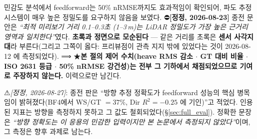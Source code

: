 \documentclass[11pt]{report}
\numberwithin{equation}{chapter}
\numberwithin{figure}{chapter}
\numberwithin{table}{chapter}
\begin{document}
민감도 분석에서 feedforward는 50\% nRMSE까지도 효과적임이 확인되어,
파도 추정 시스템이 매우 높은 정밀도를 요구하지 않음을 보였다.
⛔\textbf{[정정, 2026-08-23]} 종전 문안은 \emph{``최적 미리보기 거리 0.1--0.3초
(1--3\,m)는 LiDAR 정밀도가 가장 높은 근거리 영역과 일치한다''}였다. \textbf{초록과
정면으로 모순된다} --- 같은 거리를 초록은 \textbf{센서 사각지대}라 부른다(그리고 그쪽이
옳다: 프리뷰점이 관측 지지 밖에 있었다는 것이 2026-08-12 에 측정되었다).
⟹ ★\textbf{본 절의 제어 수치(heave RMS 감소 $\cdot$ GT 대비 비율 $\cdot$ ISO 2631 등급
$\cdot$ 50\% nRMSE 강건성)는 전부 그 기하에서 채점되었으므로 기여로 주장하지 않는다.}
이력으로만 남긴다.

⚠\emph{[정정, 2026-08-27]}: 종전 판은 ``방향 추정 정확도가 feedforward 성능의 핵심
병목임이 밝혀졌다(BF4에서 WS/GT $=37\%$, Dir $R^2 = -0.25$ 에 기인)''고 적었다.
인용된 지표는 방향을 측정하지 못하고 그 값도 철회되었다(\S\ref{sec:full_eval}).
정확한 문장은 \emph{``방향 정확도는 이 응용의 민감한 입력이지만 본 논문에서 측정되지
않았다''}이며, 그 측정은 향후 과제로 남는다.
\end{document}
